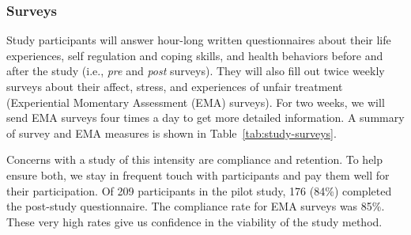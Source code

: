 \subsubsection{Surveys}
Study participants will answer hour-long written questionnaires about their life experiences, self regulation and coping skills, and health behaviors before and after the study (i.e., \textit{pre} and \textit{post} surveys).  They will also fill out twice weekly surveys about their affect, stress, and experiences of unfair treatment (Experiential Momentary Assessment (EMA) surveys).  For two weeks, we will send EMA surveys four times a day to get more detailed information. A summary of survey and EMA measures is shown in Table~\ref{tab:study-surveys}.

Concerns with a study of this intensity are compliance and retention. To help ensure both, we stay in frequent touch with participants and pay them well for their participation.  Of 209 participants in the pilot study, 176 (84\%)  completed the post-study questionnaire. The  compliance rate for EMA surveys was 85\%. These very high rates give us confidence in the viability of the study method. 


